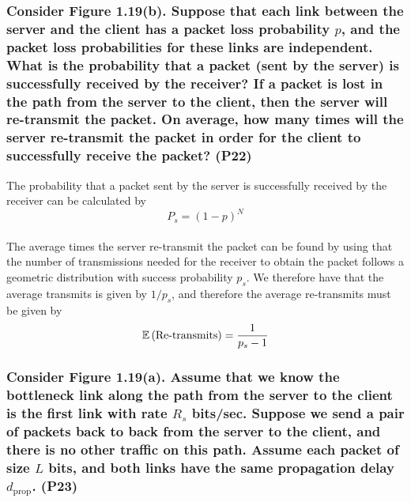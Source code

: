 \subsubsection{Consider Figure 1.19(b). Suppose that each link between the server and the client has a packet loss probability $p$, and the packet loss probabilities for these links are independent. What is the probability that a packet (sent by the server) is successfully received by the receiver? If a packet is lost in the path from the server to the client, then the server will re-transmit the packet. On average, how many times will the server re-transmit the packet in order for the client to successfully receive the packet? (P22)}

The probability that a packet sent by the server is successfully received by the receiver can be calculated by 
\begin{equation*}
    P_s = (1 - p)^N
\end{equation*}
\\
The average times the server re-transmit the packet can be found by using that the number of transmissions needed for the receiver to obtain the packet follows a geometric distribution with success probability $p_s$. We therefore have that the average transmits is given by $1/p_s$, and therefore the average re-transmits must be given by
\begin{equation*}
    \E \lr{\text{Re-transmits}} = \frac{1}{p_s - 1} 
\end{equation*}



\subsubsection{Consider Figure 1.19(a). Assume that we know the bottleneck link along the path from the server to the client is the first link with rate $R_s$ bits/sec. Suppose we send a pair of packets back to back from the server to the client, and there is no other traffic on this path. Assume each packet of size $L$ bits, and both links have the same propagation delay $d_{\text{prop}}$. (P23)}

